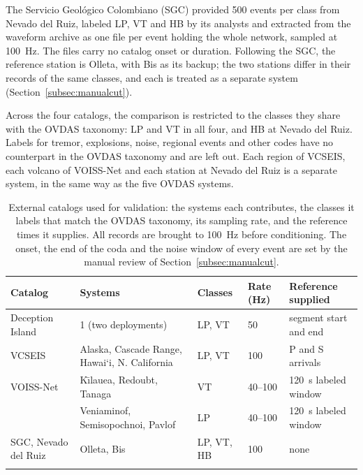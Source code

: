 \documentclass[pdflatex,sn-mathphys-num]{sn-jnl}
\begin{document}
The Servicio Geol\'ogico Colombiano (SGC) provided 500 events per class from
Nevado del Ruiz, labeled LP, VT and HB by its analysts and extracted from the
waveform archive as one file per event holding the whole network, sampled at
100~Hz. The files carry no catalog onset or duration. Following the SGC, the
reference station is Olleta, with Bis as its backup; the two stations differ
in their records of the same classes, and each is treated as a separate
system (Section~\ref{subsec:manualcut}).

Across the four catalogs, the comparison is restricted to the classes they
share with the OVDAS taxonomy: LP and VT in all four, and HB at Nevado del
Ruiz. Labels for tremor, explosions, noise, regional events and other codes
have no counterpart in the OVDAS taxonomy and are left out. Each region of
VCSEIS, each volcano of VOISS-Net and each station at Nevado del Ruiz is a
separate system, in the same way as the five OVDAS systems.

\begin{table}[h]
\caption{External catalogs used for validation: the systems each contributes,
the classes it labels that match the OVDAS taxonomy, its sampling rate, and
the reference times it supplies. All records are brought to 100~Hz before
conditioning. The onset, the end of the coda and the noise window of every
event are set by the manual review of Section~\ref{subsec:manualcut}.}
\label{tab:external}
\begin{tabular}{@{}lp{3.2cm}llp{2.2cm}@{}}
\toprule
Catalog & Systems & Classes & Rate (Hz) & Reference supplied \\
\midrule
Deception Island \cite{cortes_standardization_2019} & 1 (two deployments) & LP, VT & 50 & segment start and end \\
VCSEIS \cite{zhong_deep-learning-based_2024} & Alaska, Cascade Range, Hawai`i, N. California & LP, VT & 100 & P and S arrivals \\
VOISS-Net \cite{fee_generalized_2025} & K\={\i}lauea, Redoubt, Tanaga & VT & 40--100 & 120~s labeled window \\
 & Veniaminof, Semisopochnoi, Pavlof & LP & 40--100 & 120~s labeled window \\
SGC, Nevado del Ruiz & Olleta, Bis & LP, VT, HB & 100 & none \\
\botrule
\end{tabular}
\end{table}


\end{document}
